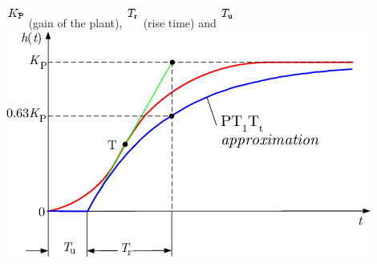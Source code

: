 \documentclass[]{article}
\begin{document}
\includegraphics[width=0.23958in,height=0.27083in]{./Empirical tuning rules according to Ziegler and Nichols_files/img62.png}
(gain of the plant),
\includegraphics[width=0.17708in,height=0.27083in]{./Empirical tuning rules according to Ziegler and Nichols_files/img63.png}
(rise time) and
\includegraphics[width=0.18750in,height=0.27083in]{./Empirical tuning rules according to Ziegler and Nichols_files/img64.png}
\includegraphics[width=4.72917in,height=2.93750in]{./Empirical tuning rules according to Ziegler and Nichols_files/img1242.png}
\end{document}
